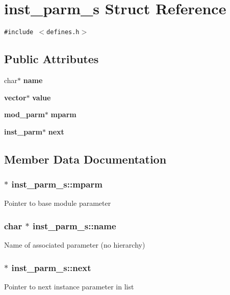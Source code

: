 \section{inst\_\-parm\_\-s  Struct Reference}
\label{structinst__parm__s}
{\tt \#include $<$defines.h$>$}

\subsection*{Public Attributes}
\begin{CompactItemize}
\item 
char$\ast$ {\bf name}
\item 
{\bf vector}$\ast$ {\bf value}
\item 
{\bf mod\_\-parm}$\ast$ {\bf mparm}
\item 
{\bf inst\_\-parm}$\ast$ {\bf next}
\end{CompactItemize}


\subsection{Member Data Documentation}
\subsubsection{ $\ast$ inst\_\-parm\_\-s::mparm}\label{structinst__parm__s_m2}


Pointer to base module parameter 
\subsubsection{\setlength{\rightskip}{0pt plus 5cm}char $\ast$ inst\_\-parm\_\-s::name}\label{structinst__parm__s_m0}


Name of associated parameter (no hierarchy) 
\subsubsection{ $\ast$ inst\_\-parm\_\-s::next}\label{structinst__parm__s_m3}


Pointer to next instance parameter in list 
